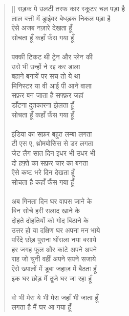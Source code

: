 \begin{verse}[\versewidth]
{सड़क पे उलटी तरफ कार स्कूटर चल पड़ा है\\
लाल बत्ती में ड्राईवर बेधड़क निकल पड़ा है\\
ऎसे अजब नज़ारे देखता हूँ\\
सोचता हूँ कहाँ फँस गया हूँ\\
\\
पक्की टिकट थी ट्रेन और प्लेन की\\
उसे भी उन्हों ने रद्द कर डाला\\
बहाने बनायें पर सच तो ये था\\
मिनिस्टर या वी आई पी आने वाला\\
सफ़र बन जाता है सफ्फ़र जहां\\
डाँटना दुतकारना झेलता हूँ\\
सोचता हूँ कहाँ फँस गया हूँ\\
\\
इंडिया का सफ़र बहुत लम्बा लगता\\
टी एस ए, थ्रोमबोसिस से डर लगता\\
जेट लैग सात दिन इधर भी उधर भी\\
दो हफ़्ते का सफ़र चार का बनता\\
ऎसे कष्ट भरे दिन देखता हूँ\\
सोचता है कहाँ फँस गया हूँ\\
\\
अब गिनता दिन घर वापस जाने के\\
बिन सोचे हरी सलाद खाने के\\
दोहते दोहतियों को गोद बिठाने के\\
उत्तर हो या दक्षिण घर अपना मन भाये\\
परिंदे छोड़ पुराना घोंसला नया बसाये\\
हर जगह फूल और कांटे अपने अपने\\
राह जो चुनी वहीं अपने सपने सजाये\\
ऎसे ख्यालों में डूबा जहाज़ में बैठता हूँ\\
इक घर छोड़ मैं दूजे घर जा रहा हूँ\\
\\
वो भी मेरा ये भी मेरा जहाँ भी जाता हूँ\\
लगता है मैं घर आ गया हूँ
}
\end{verse}

